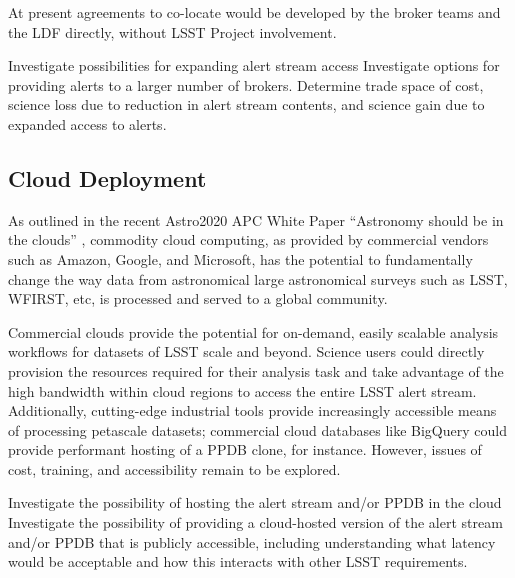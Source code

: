 At present agreements to co-locate would be developed by the broker teams and the  {LDF} directly, without   LSST Project involvement.


{Investigate possibilities for expanding alert stream access}
{Investigate options for providing alerts to a larger number of brokers. 
Determine trade space of cost, science loss due to reduction in alert stream contents, and science gain due to expanded access to alerts.}

\subsection{Cloud Deployment}

As outlined in the  recent Astro2020  {APC} White Paper ``Astronomy should be in the clouds'' \cite{Smith:2019gqn}, commodity cloud computing, as provided by commercial vendors such as Amazon, Google, and Microsoft, has the potential to fundamentally change the way data from astronomical large astronomical surveys such as   LSST,  {WFIRST}, etc, is processed and served to a global community. 

Commercial clouds provide the potential for on-demand, easily scalable analysis workflows for datasets of   LSST scale and beyond.  
Science users could directly provision the resources required for their analysis task and take advantage of the high bandwidth within cloud regions to access the entire   LSST alert stream.  
Additionally, cutting-edge industrial tools provide increasingly accessible means of processing petascale datasets;
commercial cloud databases like BigQuery could provide performant hosting of a  {PPDB} clone, for instance.
However, issues of cost, training, and accessibility remain to be explored.

{Investigate the possibility of hosting the alert stream and/or  {PPDB} in the cloud}
{Investigate the possibility of providing a cloud-hosted version of the alert stream and/or  {PPDB} that is publicly accessible, including understanding what latency would be acceptable and how  this interacts with other   LSST requirements.}